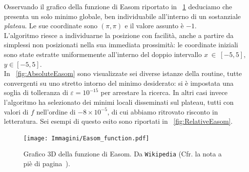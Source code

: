 Osservando il grafico della funzione di Easom riportato in \figurename~{\ref{fig:EasomPlot}} deduciamo che presenta un solo minimo globale, ben individuabile all'interno di un sostanziale \emph{plateau}. Le sue coordinate sono $(\pi,\pi)$ e il valore assunto è $-1$.\\

\noindent L'algoritmo riesce a individuarne la posizione con facilità, anche a partire da simplessi non posizionati nella sua immediata prossimità: le coordinate iniziali sono state estratte uniformemente all'interno del doppio intervallo $x~\in~[-5,5]$, $y\in[-5,5]$.\\

\noindent  In \figurename~\ref{fig:AbsoluteEasom} sono visualizzate sei diverse istanze della routine, tutte convergenti su uno stretto intorno del minimo desiderato: si è impostata una soglia di tolleranza di $\varepsilon=10^{-15}$ per arrestare la ricerca. In altri casi invece l'algoritmo ha selezionato dei minimi locali disseminati sul plateau, tutti con valori di $f$ nell'ordine di $-8\times 10^{-5}$, di cui abbiamo ritrovato risconto in letteratura. Sei esempi di questo esito sono riportati in \figurename~\ref{fig:RelativeEasom}.

\begin{figure}[h!]
	\centering
	\texttt{[image: Immagini/Easom\_function.pdf]}
		\caption{Grafico 3D della funzione di Easom. Da \texttt{Wikipedia} (Cfr. la nota a piè di pagina~\pageref{WikipediaFootnote}).}
	\label{fig:EasomPlot}
\end{figure}

